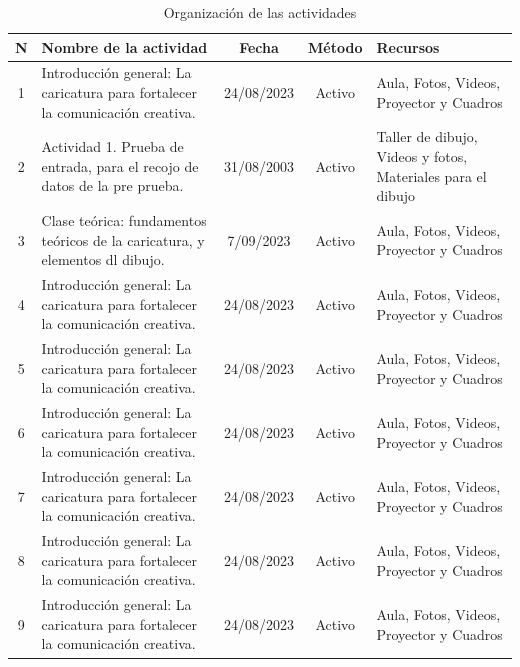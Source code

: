\documentclass[12pt,a4paper]{article}
\begin{document}
\begin{table}
	\caption{Organización de las actividades}
	\label{Organizacion}
	\begin{tabular}{cp{4.5cm}ccp{4cm}}\hline
	N & \bf Nombre de la actividad                                                        & \bf Fecha      & \bf Método & \bf Recursos                                  \\\hline
	1 & Introducción general: La caricatura para fortalecer la comunicación creativa. & 24/08/2023 & Activo & Aula, Fotos, Videos, Proyector  y Cuadros \\\hline
	2 & Actividad 1. Prueba de entrada, para el recojo de datos de la pre prueba. & 31/08/2003 & Activo & Taller de dibujo, Videos y fotos, Materiales para el dibujo\\\hline
	3 & Clase teórica: fundamentos teóricos de la caricatura, y elementos dl dibujo. & 7/09/2023 & Activo & Aula, Fotos, Videos, Proyector  y Cuadros \\\hline
	4 & Introducción general: La caricatura para fortalecer la comunicación creativa. & 24/08/2023 & Activo & Aula, Fotos, Videos, Proyector  y Cuadros \\\hline
	5 & Introducción general: La caricatura para fortalecer la comunicación creativa. & 24/08/2023 & Activo & Aula, Fotos, Videos, Proyector  y Cuadros \\\hline
	6 & Introducción general: La caricatura para fortalecer la comunicación creativa. & 24/08/2023 & Activo & Aula, Fotos, Videos, Proyector  y Cuadros \\\hline
	7 & Introducción general: La caricatura para fortalecer la comunicación creativa. & 24/08/2023 & Activo & Aula, Fotos, Videos, Proyector  y Cuadros \\\hline
	8 & Introducción general: La caricatura para fortalecer la comunicación creativa. & 24/08/2023 & Activo & Aula, Fotos, Videos, Proyector  y Cuadros \\\hline
    9 & Introducción general: La caricatura para fortalecer la comunicación creativa. & 24/08/2023 & Activo & Aula, Fotos, Videos, Proyector  y Cuadros \\\hline
\end{tabular}
\end{table}
\end{document}
